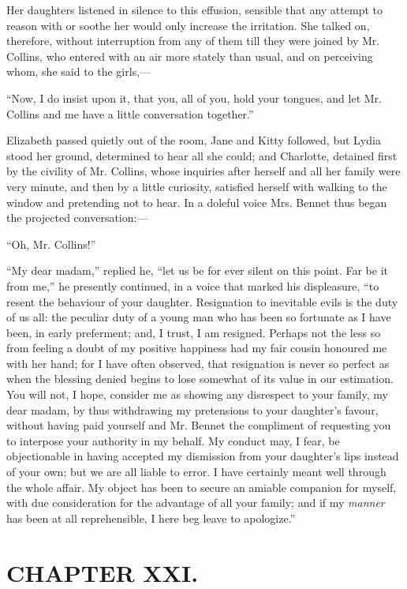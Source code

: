 Her daughters listened in silence to this effusion, sensible that any attempt to reason with or soothe her would only increase the irritation. She talked on, therefore, without interruption from any of them till they were joined by Mr. Collins, who entered with an air more stately than usual, and on perceiving whom, she said to the girls,---

``Now, I do insist upon it, that you, all of you, hold your tongues, and let Mr. Collins and me have a little conversation together.''

Elizabeth passed quietly out of the room, Jane and Kitty followed, but Lydia stood her ground, determined to hear all she could; and Charlotte, detained first by the civility of Mr. Collins, whose inquiries after herself and all her family were very minute, and then by a little curiosity, satisfied herself with walking to the window and pretending not to hear. In a doleful voice Mrs. Bennet thus began the projected conversation:---

``Oh, Mr. Collins!''

``My dear madam,'' replied he, ``let us be for ever silent on this point. Far be it from me,'' he presently continued, in a voice that marked his displeasure, ``to resent the behaviour of your daughter. Resignation to inevitable evils is the duty of us all: the peculiar duty of a young man who has been so fortunate as I have been, in early preferment; and, I trust, I am resigned. Perhaps not the less so from feeling a doubt of my positive happiness had my fair cousin honoured me with her hand; for I have often observed, that resignation is never so perfect as when the blessing denied begins to lose somewhat of its value in our estimation. You will not, I hope, consider me as showing any disrespect to your family, my dear madam, by thus withdrawing my pretensions to your daughter's favour, without having paid yourself and Mr. Bennet the compliment of requesting you to interpose your authority in my behalf. My conduct may, I fear, be objectionable in having accepted my dismission from your daughter's lips instead of your own; but we are all liable to error. I have certainly meant well through the whole affair. My object has been to secure an amiable companion for myself, with due consideration for the advantage of all your family; and if my \textit{manner} has been at all reprehensible, I here beg leave to apologize.''

\chapter{CHAPTER XXI.}

